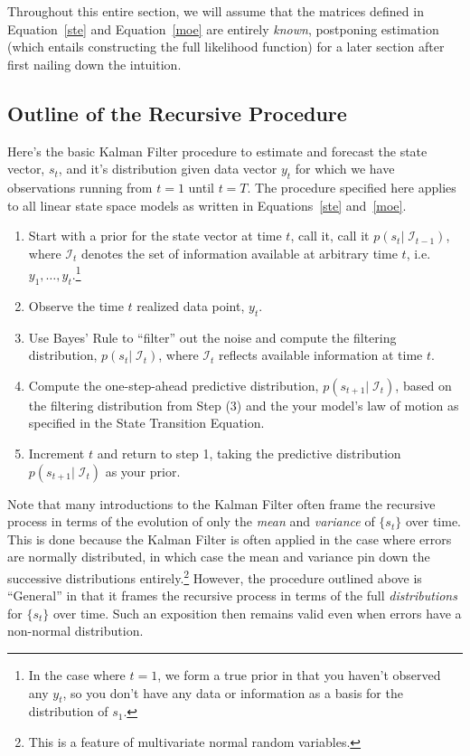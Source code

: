 \documentclass[a4paper,12pt]{article}
\begin{document}
Throughout this entire section, we will assume that the matrices defined
in Equation~\ref{ste} and Equation~\ref{moe} are entirely \emph{known},
postponing estimation (which entails constructing the full likelihood
function) for a later section after first nailing down the intuition. 

\subsection{Outline of the Recursive Procedure}
\label{subsec:kfoutline}

Here's the basic Kalman Filter procedure to estimate and forecast the
state vector, $s_t$, and it's distribution given data vector $y_t$ for
which we have observations running from $t=1$ until $t=T$. The procedure
specified here applies to all linear state space models as written in
Equations~\ref{ste} and~\ref{moe}.
\begin{enumerate}
\item Start with a prior for the state vector at time $t$, call it, call
  it $p(s_t |\; \mathcal{I}_{t-1})$, where $\mathcal{I}_{t}$ denotes the
  set of information available at arbitrary time $t$, i.e. $y_1, \ldots,
  y_{t}$.\footnote{In the case where $t=1$, we form a true prior in that
  you haven't observed any $y_t$, so you don't have any data or
  information as a basis for the distribution of $s_1$.}

\item Observe the time $t$ realized data point, $y_t$. 

\item Use Bayes' Rule to ``filter'' out the noise and compute the
  filtering distribution, $p(s_t |\; \mathcal{I}_{t})$, where
  $\mathcal{I}_{t}$ reflects available information at time $t$.

\item Compute the one-step-ahead predictive distribution, $p(s_{t+1} |
  \; \mathcal{I}_{t})$, based on the filtering distribution from Step
  (3) and the your model's law of motion as specified in the State
  Transition Equation.  

\item Increment $t$ and return to step 1, taking the predictive
  distribution $p(s_{t+1} |\; \mathcal{I}_{t})$ as your prior.
\end{enumerate} 
Note that many introductions to the Kalman Filter often frame the
recursive process in terms of the evolution of only the \emph{mean} and
\emph{variance} of $\{s_t\}$ over time. This is done because the Kalman
Filter is often applied in the case where errors are normally
distributed, in which case the mean and variance pin down the successive
distributions {entirely}.\footnote{This is a feature of multivariate
normal random variables.} However, the procedure outlined above is
``General'' in that it frames the recursive process in terms of the full
\emph{distributions} for $\{s_t\}$ over time. Such an exposition then
remains valid even when errors have a non-normal distribution.
\end{document}
